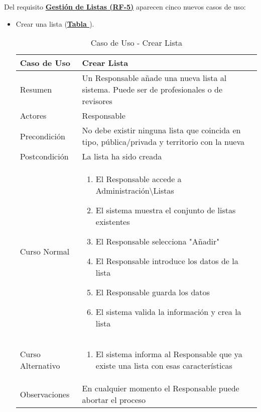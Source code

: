 Del requisito \textbf{\hyperref[tab:rfGestLst]{Gestión de Listas (RF-5)}} aparecen cinco nuevos casos de uso:
\begin{itemize}
	\item \addtocounter{tabla}{1} Crear una lista (\textbf{\hyperref[tab:curCrearLista]{Tabla }}).
		\begin{table}[!htbp]
		  \centering  \addtocounter{casouso}{1}
		  \begin{tabular}{|l | p{100mm}|}
		    \textbf{Caso de Uso}  & \textbf{Crear Lista} \\ \hline
		    Resumen 		 & Un Responsable añade una nueva lista al sistema. Puede ser de profesionales o de revisores \\ \hline
		    Actores  		 & Responsable \\ \hline
		    Precondición  	 & No debe existir ninguna lista que coincida en tipo, pública/privada y territorio con la nueva  \\ \hline
		    Postcondición  	 & La lista ha sido creada \\ \hline
		    Curso Normal   	 & \begin{enumerate}
			  \item El Responsable accede a Administración\textbackslash Listas
			  \item El sistema muestra el conjunto de listas existentes
			  \item El Responsable selecciona "Añadir"
			  \item El Responsable introduce los datos de la lista
			  \item El Responsable guarda los datos
			  \item El sistema valida la información y crea la lista
		    \end{enumerate}  \\ \hline
		    Curso Alternativo  & \begin{enumerate}
			  \item El sistema informa al Responsable que ya existe una lista con esas características
		    \end{enumerate}  \\ \hline
		    Observaciones 	 & En cualquier momento el Responsable puede abortar el proceso  \\ \hline
		  \end{tabular}
		  \caption{Caso de Uso  - Crear Lista}
		  \label{tab:curCrearLista}
		\end{table}
		\FloatBarrier
	

\end{itemize}

